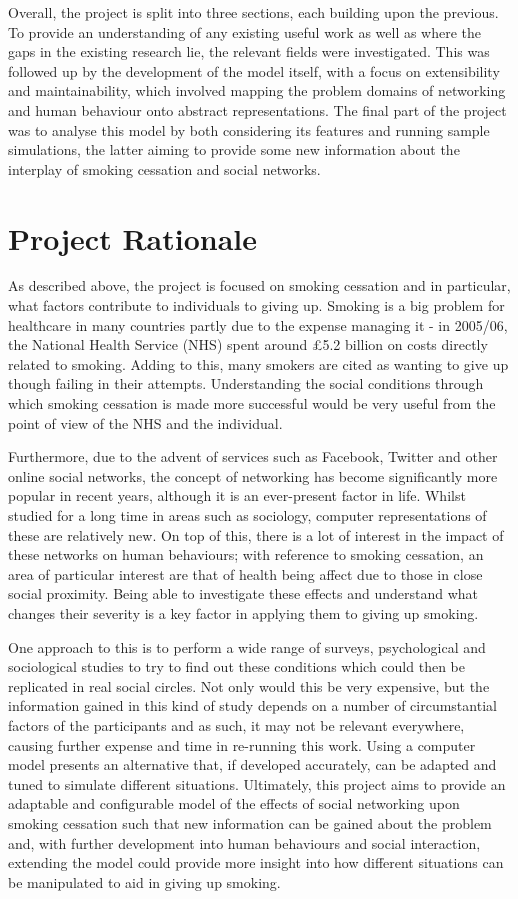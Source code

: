 \documentclass[]{report}
\begin{document}
Overall, the project is split into three sections, each building upon the previous. To provide an understanding of any existing useful work as well as where the gaps in the existing research lie, the relevant fields were investigated. This was followed up by the development of the model itself, with a focus on extensibility and maintainability, which involved mapping the problem domains of networking and human behaviour onto abstract representations. The final part of the project was to analyse this model by both considering its features and running sample simulations, the latter aiming to provide some new information about the interplay of smoking cessation and social networks.

\section{Project Rationale}
As described above, the project is focused on smoking cessation and in particular, what factors contribute to individuals to giving up. Smoking is a big problem for healthcare in many countries partly due to the expense managing it - in 2005/06, the National Health Service (NHS) spent around \pounds5.2 billion on costs directly related to smoking\cite{NHS-78}. Adding to this, many smokers are cited as wanting to give up though failing in their attempts\cite{NHS-44}. Understanding the social conditions through which smoking cessation is made more successful would be very useful from the point of view of the NHS and the individual.

Furthermore, due to the advent of services such as Facebook, Twitter and other online social networks, the concept of networking has become significantly more popular in recent years, although it is an ever-present factor in life\cite{USN-4}. Whilst studied for a long time in areas such as sociology, computer representations of these are relatively new. On top of this, there is a lot of interest in the impact of these networks on human behaviours; with reference to smoking cessation, an area of particular interest are that of health being affect due to those in close social proximity. Being able to investigate these effects and understand what changes their severity is a key factor in applying them to giving up smoking.

One approach to this is to perform a wide range of surveys, psychological and sociological studies to try to find out these conditions which could then be replicated in real social circles. Not only would this be very expensive, but the information gained in this kind of study depends on a number of circumstantial factors of the participants and as such, it may not be relevant everywhere, causing further expense and time in re-running this work. Using a computer model presents an alternative that, if developed accurately, can be adapted and tuned to simulate different situations. Ultimately, this project aims to provide an adaptable and configurable model of the effects of social networking upon smoking cessation such that new information can be gained about the problem and, with further development into human behaviours and social interaction, extending the model could provide more insight into how different situations can be manipulated to aid in giving up smoking.
\end{document}
